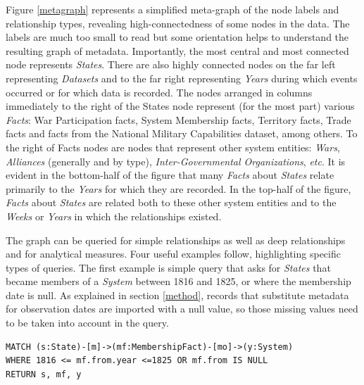 \documentclass[runningheads]{llncs}
\begin{document}
Figure \ref{metagraph} represents a simplified meta-graph of the node labels and relationship types, revealing high-connectedness of some nodes in the data. 
The labels are much too small to read but some orientation helps to understand the resulting graph of metadata.
Importantly, the most central and most connected node represents \textit{States}. 
There are also highly connected nodes on the far left representing \textit{Datasets} and to the far right representing \textit{Years} during which events occurred or for which data is recorded. 
The nodes arranged in columns immediately to the right of the States node represent (for the most part) various \textit{Facts}: War Participation facts, System Membership facts, Territory facts, Trade facts and facts from the National Military Capabilities \cite{Singer1987} dataset, among others. 
To the right of Facts nodes are nodes that represent other system entities: \textit{Wars}, \textit{Alliances} (generally and by type), \textit{Inter-Governmental Organizations}, \textit{etc}.
It is evident in the bottom-half of the figure that many \textit{Facts} about \textit{States} relate primarily to the \textit{Years} for which they are recorded.
In the top-half of the figure, \textit{Facts} about \textit{States} are related both to these other system entities and to the \textit{Weeks} or \textit{Years} in which the relationships existed.

The graph can be queried for simple relationships as well as deep relationships and for analytical measures. 
Four useful examples follow, highlighting specific types of queries. 
The first example is simple query that asks for \textit{States} that became members of a \textit{System} between 1816 and 1825, or where the membership date is null. 
As explained in section \ref{method}, records that substitute metadata for observation dates are imported with a null value, so those missing values need to be taken into account in the query.

\begin{lstlisting}[caption={Simple relationship query.}, label={lst:simple}]
MATCH (s:State)-[m]->(mf:MembershipFact)-[mo]->(y:System) 
WHERE 1816 <= mf.from.year <=1825 OR mf.from IS NULL 
RETURN s, mf, y
\end{lstlisting}
\end{document}
